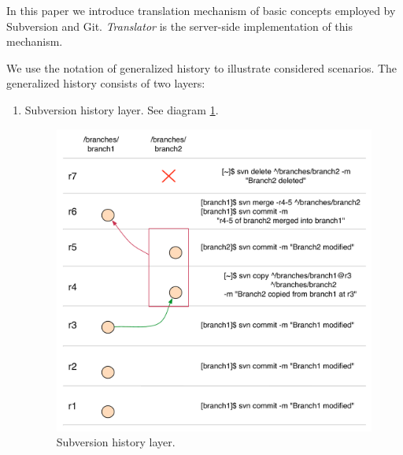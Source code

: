 In this paper we introduce translation mechanism of basic concepts employed by Subversion and Git. \emph{Translator} is the server-side implementation of this mechanism.

We use the notation of generalized history to illustrate considered scenarios. The generalized history consists of two layers:
\begin{enumerate}
	\item Subversion history layer. See diagram \ref{svn_layer}.
	\begin{figure}[!h]
	\label{svn_layer}
	\centering
	\includegraphics[width=\linewidth]{img/legend/svn_layer.pdf}
	\caption{Subversion history layer.}
	\end{figure}


\end{enumerate}
